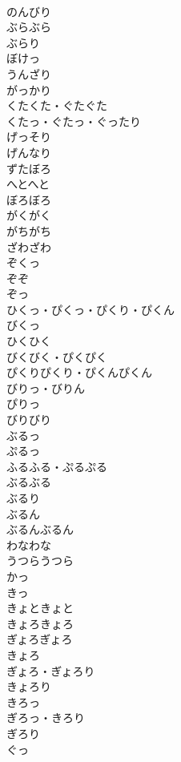 \documentclass[8pt]{extreport}
\begin{document}
\begin{CJK}{UTF8}{min}
\\	のんびり	
\\	ぶらぶら	
\\	ぶらり	
\\	ぼけっ	
\\	うんざり	
\\	がっかり	
\\	くたくた・ぐたぐた	
\\	くたっ・ぐたっ・ぐったり	
\\	げっそり	
\\	げんなり	
\\	ずたぼろ	
\\	へとへと	
\\	ぼろぼろ	
\\	がくがく	
\\	がちがち	
\\	ざわざわ	
\\	ぞくっ	
\\	ぞぞ	
\\	ぞっ	
\\	ひくっ・ぴくっ・ぴくり・ぴくん	
\\	びくっ	
\\	ひくひく	
\\	びくびく・ぴくぴく	
\\	ぴくりぴくり・ぴくんぴくん	
\\	びりっ・びりん	
\\	ぴりっ	
\\	びりびり	
\\	ぶるっ	
\\	ぷるっ	
\\	ふるふる・ぷるぷる	
\\	ぶるぶる	
\\	ぶるり	
\\	ぶるん	
\\	ぶるんぶるん	
\\	わなわな	
\\	うつらうつら	
\\	かっ	
\\	きっ	
\\	きょときょと	
\\	きょろきょろ	
\\	ぎょろぎょろ	
\\	きょろ	
\\	ぎょろ・ぎょろり	
\\	きょろり	
\\	きろっ	
\\	ぎろっ・きろり	
\\	ぎろり	
\\	ぐっ	

\end{CJK}
\end{document}
